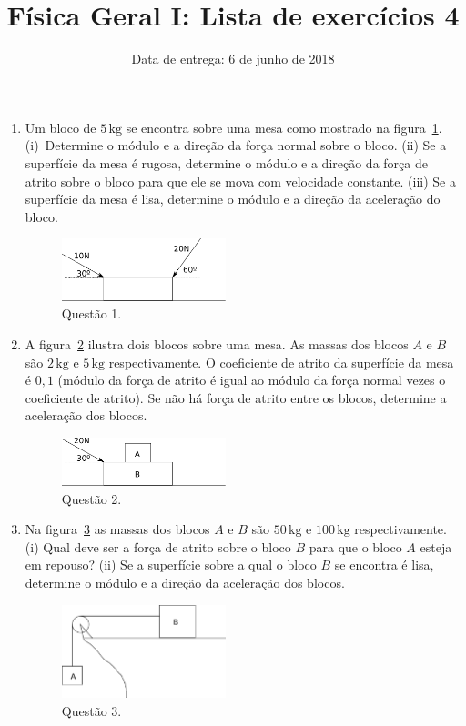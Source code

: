 \documentclass[11pt,a4paper,twocolumn]{article}
\title{Física Geral I: Lista de exercícios 4}
\author{Data de entrega: 6 de junho de 2018}
\date{}
\newcommand{\un}[1]{\mathrm{#1}}
\begin{document}
\maketitle
\begin{enumerate}
\item Um bloco de $5\,\un{kg}$ se encontra sobre uma mesa como
  mostrado na figura~\ref{fig:1}. (i)~Determine o módulo e a direção
  da força normal sobre o bloco. (ii) Se a superfície da mesa é
  rugosa, determine o módulo e a direção da força de atrito sobre o
  bloco para que ele se mova com velocidade constante. (iii) Se a
  superfície da mesa é lisa, determine o módulo e a direção da
  aceleração do bloco.
  \begin{figure}[h]
    \centering
    \includegraphics[width=0.45\textwidth,keepaspectratio]{lista4-questao1.pdf}
    \caption{Questão 1.}
    \label{fig:1}
  \end{figure}
\item A figura~\ref{fig:2} ilustra dois blocos sobre uma mesa. As
  massas dos blocos $A$ e $B$ são $2\,\un{kg}$ e $5\,\un{kg}$
  respectivamente. O coeficiente de atrito da superfície da mesa é
  $0{,}1$ (módulo da força de atrito é igual ao módulo da força normal
  vezes o coeficiente de atrito). Se não há força de atrito entre os
  blocos, determine a aceleração dos blocos.
  \begin{figure}[h]
    \centering
    \includegraphics[width=0.45\textwidth,keepaspectratio]{lista4-questao2.pdf}
    \caption{Questão 2.}
    \label{fig:2}
  \end{figure}
\item Na figura~\ref{fig:3} as massas dos blocos $A$ e $B$ são
  $50\,\un{kg}$ e $100\,\un{kg}$ respectivamente. (i) Qual deve ser a
  força de atrito sobre o bloco $B$ para que o bloco $A$ esteja em
  repouso? (ii) Se a superfície sobre a qual o bloco $B$ se encontra é
  lisa, determine o módulo e a direção da aceleração dos blocos.
  \begin{figure}[h]
    \centering
    \includegraphics[width=0.45\textwidth,keepaspectratio]{lista4-questao3.pdf}
    \caption{Questão 3.}
    \label{fig:3}
  \end{figure}
\end{enumerate}
\end{document}
